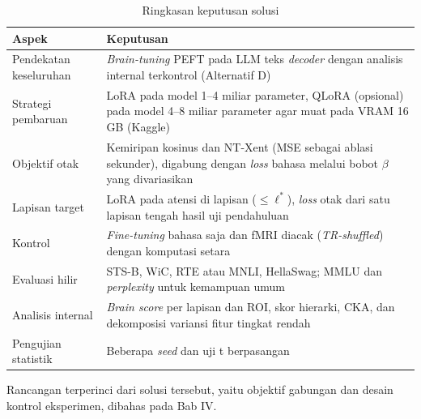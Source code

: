   \begin{table}[h]
    \centering
    \caption{Ringkasan keputusan solusi}
    \label{tab:am_ringkas}
    \small
    \begin{tabularx}{\textwidth}{p{2.9cm} | X}
      \hline
      \textbf{Aspek} & \textbf{Keputusan} \\
      \hline
      Pendekatan \newline keseluruhan & \textit{Brain-tuning} PEFT pada LLM teks \textit{decoder} dengan analisis internal terkontrol (Alternatif D) \\
      Strategi \newline pembaruan & LoRA pada model 1--4 miliar parameter, QLoRA (opsional) pada model 4--8 miliar parameter agar muat pada VRAM 16 GB (Kaggle) \\
      Objektif otak & Kemiripan kosinus dan NT-Xent (MSE sebagai ablasi sekunder), digabung dengan \textit{loss} bahasa melalui bobot $\beta$ yang divariasikan \\
      Lapisan target & LoRA pada atensi di lapisan ($\le \ell^*$), \textit{loss} otak dari satu lapisan tengah hasil uji pendahuluan \\
      Kontrol & \textit{Fine-tuning} bahasa saja dan fMRI diacak (\textit{TR-shuffled}) dengan komputasi setara \\
      Evaluasi hilir & STS-B, WiC, RTE atau MNLI, HellaSwag; MMLU dan \textit{perplexity} untuk kemampuan umum \\
      Analisis internal & \textit{Brain score} per lapisan dan ROI, skor hierarki, CKA, dan dekomposisi variansi fitur tingkat rendah \\
      Pengujian statistik & Beberapa \textit{seed} dan uji t berpasangan \\
      \hline
    \end{tabularx}
  \end{table}

  Rancangan terperinci dari solusi tersebut, yaitu objektif gabungan dan desain kontrol eksperimen, dibahas pada Bab IV.